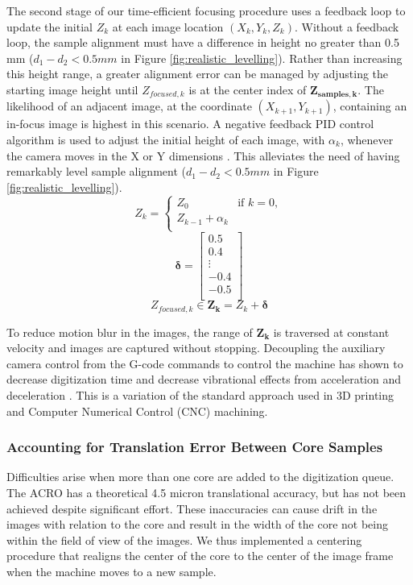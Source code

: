 \documentclass[a4paper,12pt]{article}
\begin{document}
The second stage of our time-efficient focusing procedure uses a feedback loop to update the initial $Z_k$ at each image location $(X_k, Y_k, Z_k)$. 
Without a feedback loop, the sample alignment must have a difference in height no greater than 0.5 mm ($d_1 - d_2 < 0.5 mm $ in Figure \ref{fig:realistic_levelling}). 
Rather than increasing this height range, a greater alignment error can be managed by adjusting the starting image height until $Z_{focused,k}$ is at the center index of $\boldsymbol{Z_{samples,k}}$. 
The likelihood of an adjacent image, at the coordinate $(X_{k+1}, Y_{k+1})$, containing an in-focus image is highest in this scenario. 
A negative feedback PID control algorithm is used to adjust the initial height of each image, with $\alpha_k$, whenever the camera moves in the X or Y dimensions \citep{odwyer_summary_2000}. 
This alleviates the need of having remarkably level sample alignment ($d_1 - d_2 < 0.5mm$ in Figure \ref{fig:realistic_levelling}).
\[
Z_k = \begin{cases}
  Z_0 & \text{if } k = 0,\\
  Z_{k-1} + \alpha_k \\
  \end{cases}
\]
\[\boldsymbol{\delta} = 
\begin{bmatrix}
  0.5 \\
  0.4 \\
  \vdots \\
  -0.4 \\
  -0.5 \\
  \end{bmatrix}\]
\[
Z_{focused,k} \in
\boldsymbol{Z_k} = 
Z_k + \boldsymbol{\delta}
\] 

To reduce motion blur in the images, the range of $\boldsymbol{Z_k}$ is traversed at constant velocity and images are captured without stopping. 
Decoupling the auxiliary camera control from the G-code commands to control the machine has shown to decrease digitization time and decrease vibrational effects from acceleration and deceleration \citep{propst_time_2025}.
This is a variation of the standard approach used in 3D printing and Computer Numerical Control (CNC) machining. 
  
\subsubsection{Accounting for Translation Error Between Core Samples}

Difficulties arise when more than one core are added to the digitization queue.
The ACRO has a theoretical 4.5 micron translational accuracy, but has not been achieved despite significant effort.
These inaccuracies can cause drift in the images with relation to the core and result in the width of the core not being within the field of view of the images.
We thus implemented a centering procedure that realigns the center of the core to the center of the image frame when the machine moves 
to a new sample. 
\end{document}
